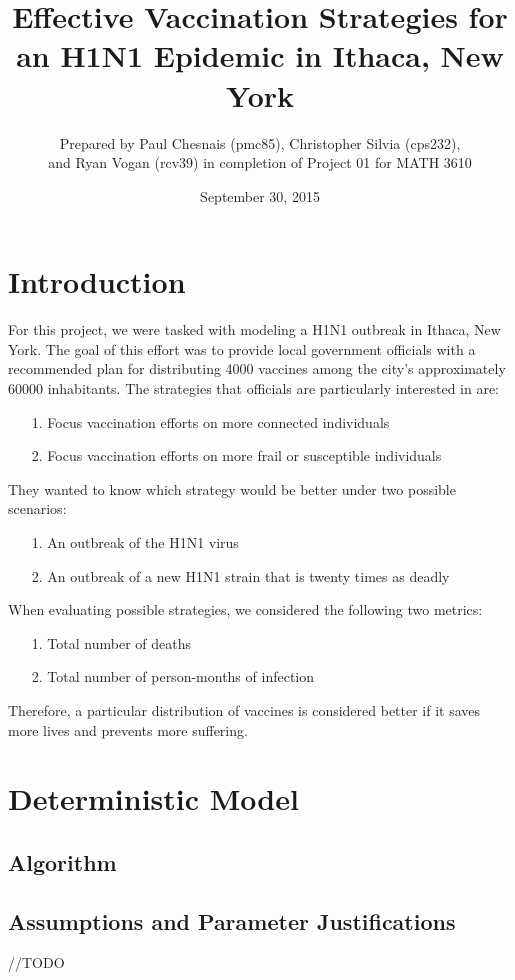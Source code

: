 \documentclass[titlepage]{article}
\title{Effective Vaccination Strategies for an H1N1 Epidemic in Ithaca, New York}
\author{Prepared by Paul Chesnais (pmc85), Christopher Silvia (cps232), \\ and Ryan Vogan (rcv39) in completion of Project 01 for MATH 3610}
\date{September 30, 2015}
\begin{document}
\maketitle

\section{Introduction}
	For this project, we were tasked with modeling a H1N1 outbreak in Ithaca, New York. The goal of this effort was to provide local government officials with a recommended plan for distributing 4000 vaccines among the city's approximately 60000 inhabitants. The strategies that officials are particularly interested in are:
	\begin{itemize}
		\item[1.]
			Focus vaccination efforts on more connected individuals
		\item[2.]
			Focus vaccination efforts on more frail or susceptible individuals
	\end{itemize}
	They wanted to know which strategy would be better under two possible scenarios:
	\begin{itemize}
		\item[1.]
			An outbreak of the H1N1 virus
		\item[2.]
			An outbreak of a new H1N1 strain that is twenty times as deadly
	\end{itemize}
	When evaluating possible strategies, we considered the following two metrics:
	\begin{itemize}
		\item[1.]
			Total number of deaths
		\item[2.]
			Total number of person-months of infection
	\end{itemize}
	Therefore, a particular distribution of vaccines is considered better if it saves more lives and prevents more suffering. 

\section{Deterministic Model}
\subsection{Algorithm}

\subsection{Assumptions and Parameter Justifications}
	//TODO
\end{document}
